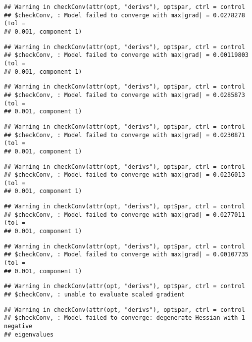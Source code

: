 \documentclass[]{article}
\begin{document}
\begin{verbatim}
## Warning in checkConv(attr(opt, "derivs"), opt$par, ctrl = control
## $checkConv, : Model failed to converge with max|grad| = 0.0278278 (tol =
## 0.001, component 1)
\end{verbatim}

\begin{verbatim}
## Warning in checkConv(attr(opt, "derivs"), opt$par, ctrl = control
## $checkConv, : Model failed to converge with max|grad| = 0.00119803 (tol =
## 0.001, component 1)
\end{verbatim}

\begin{verbatim}
## Warning in checkConv(attr(opt, "derivs"), opt$par, ctrl = control
## $checkConv, : Model failed to converge with max|grad| = 0.0285873 (tol =
## 0.001, component 1)
\end{verbatim}

\begin{verbatim}
## Warning in checkConv(attr(opt, "derivs"), opt$par, ctrl = control
## $checkConv, : Model failed to converge with max|grad| = 0.0230871 (tol =
## 0.001, component 1)
\end{verbatim}

\begin{verbatim}
## Warning in checkConv(attr(opt, "derivs"), opt$par, ctrl = control
## $checkConv, : Model failed to converge with max|grad| = 0.0236013 (tol =
## 0.001, component 1)
\end{verbatim}

\begin{verbatim}
## Warning in checkConv(attr(opt, "derivs"), opt$par, ctrl = control
## $checkConv, : Model failed to converge with max|grad| = 0.0277011 (tol =
## 0.001, component 1)
\end{verbatim}

\begin{verbatim}
## Warning in checkConv(attr(opt, "derivs"), opt$par, ctrl = control
## $checkConv, : Model failed to converge with max|grad| = 0.00107735 (tol =
## 0.001, component 1)
\end{verbatim}

\begin{verbatim}
## Warning in checkConv(attr(opt, "derivs"), opt$par, ctrl = control
## $checkConv, : unable to evaluate scaled gradient
\end{verbatim}

\begin{verbatim}
## Warning in checkConv(attr(opt, "derivs"), opt$par, ctrl = control
## $checkConv, : Model failed to converge: degenerate Hessian with 1 negative
## eigenvalues
\end{verbatim}
\end{document}
